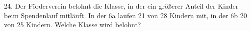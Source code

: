 \documentclass[11pt]{article}
\begin{document}
\begin{pfaufg}{}{24.}{}
Der Förderverein belohnt die Klasse, in der ein größerer Anteil der Kinder beim Spendenlauf mitläuft. In der 6a laufen 21 von 28 Kindern mit, in der 6b 20 von 25 Kindern. Welche Klasse wird belohnt?
\end{pfaufg}

\par\vfill{}
\end{document}
